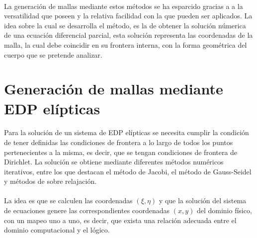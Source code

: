 \documentclass[letterpaper, openright, 12pt]{book}
\begin{document}
		\paragraph*{}
		La generación de mallas mediante estos métodos se ha esparcido gracias a a la versatilidad que poseen y la relativa facilidad con la que pueden ser aplicados. La idea sobre la cual se desarrolla el método, es la de obtener la solución númerica de una ecuación diferencial parcial, esta solución representa las coordenadas de la malla, la cual debe coincidir en su frontera interna, con la forma geométrica del cuerpo que se pretende analizar.\cite{siladic-grid-generation}
		
		\section{Generación de mallas mediante EDP elípticas}
			\paragraph*{}
				Para la solución de un sistema de EDP elípticas se necesita cumplir la condición de tener definidas las condiciones de frontera a lo largo de todos los puntos pertenecientes a la misma, es decir, que se tengan condiciones de frontera de Dirichlet.
				La solución se obtiene mediante diferentes métodos numéricos iterativos, entre los que destacan el método de Jacobi, el método de Gauss-Seidel y métodos de sobre relajación.
				
			\paragraph*{}
				La idea es que se calculen las coordenadas $(\xi, \eta)$ y que la solución del sistema de ecuaciones genere las correspondientes coordenadas $(x, y)$ del dominio físico, con un mapeo uno a uno, es decir, que exista una relación adecuada entre el dominio computacional y el lógico.
				
\end{document}
